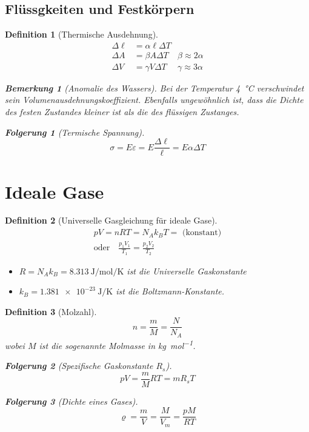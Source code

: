 \documentclass[a4paper, twocolumn]{article}
\numberwithin{equation}{section}
\theoremstyle{hsr-def}
\newtheorem{definition}{Definition}[section]
\theoremstyle{hsr-sub}
\newtheorem{result}{Folgerung}[definition]
\newtheorem{remark}{Bemerkung}[definition]
\begin{document}
\subsection{Fl\"ussgkeiten und Festk\"orpern}
\begin{definition}[Thermische Ausdehnung]
\begin{align*}
    \Delta \ell &= \alpha\ell\Delta T \\
    \Delta A &= \beta A \Delta T & \beta \approx 2\alpha \\
    \Delta V &= \gamma V \Delta T & \gamma \approx 3\alpha
\end{align*}

\begin{remark}[Anomalie des Wassers] Bei der Temperatur \SI{4}{\celsius} verschwindet sein Volumenausdehnungskoeffizient. Ebenfalls ungew\"ohnlich ist, dass die Dichte des festen Zustandes kleiner ist als die des fl\"ussigen Zustanges.
\end{remark}

\begin{result}[Termische Spannung]
\[
    \sigma = E\varepsilon = E\frac{\Delta \ell}{\ell} = E \alpha \Delta T
\]
\end{result}
\end{definition}

\section{Ideale Gase}
\begin{definition}[Universelle Gasgleichung f\"ur ideale Gase]
\begin{gather*}
    pV = nRT = N_A k_B T = \text{ (konstant)} \\
    \text{oder} \quad \frac{p_1 V_1}{T_1} = \frac{p_2 V_2}{T_2}
\end{gather*}
\begin{itemize}
    \item \(R = N_A k_B = \SI{8.313}{\joule\per\mole\per\kelvin}\) ist die Universelle Gaskonstante
    \item \(k_B = \SI{1.381e-23}{\joule\per\kelvin}\) ist die Boltzmann-Konstante.
\end{itemize}
\end{definition}

\begin{definition}[Molzahl]
\[
    n = \frac{m}{M} = \frac{N}{N_A}
\]
wobei \(M\) ist die sogenannte Molmasse in \si{\kilo\gram\per\mole}.
\begin{result}[Spezifische Gaskonstante \(R_s\)]
\[
    pV = \frac{m}{M} RT = m R_s T
\]
\end{result}

\begin{result}[Dichte eines Gases]
\[
    \varrho = \frac{m}{V} = \frac{M}{V_m} = \frac{pM}{RT}
\]
\end{result}
\end{definition}
\end{document}
